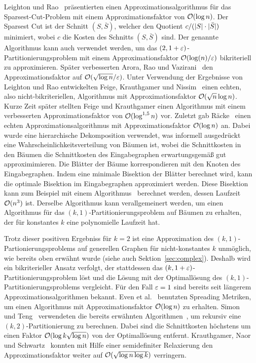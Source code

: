 Leighton und Rao~\cite{LR99} präsentierten einen Approximationsalgorithmus für das Sparsest-Cut-Problem mit einem Approximationsfaktor von $\mathcal{O}(\log n)$.
Der Sparsest Cut ist der Schnitt $(S, \bar{S})$, welcher den Quotient $c/(\lvert S\rvert \cdot  \lvert\bar{S}\rvert)$ minimiert, wobei $c$ die Kosten des Schnitts $(S, \bar{S})$ sind.
Der genannte Algorithmus kann auch verwendet werden, um das $(2, 1 + \varepsilon)$\hyp Partitionierungsproblem mit einem Approximationsfaktor $\mathcal{O}(\log(n)/\varepsilon)$ bikriteriell zu approximieren.
Später verbesserten Arora, Rao und Vazirani~\cite{ARV09} den Approximationsfaktor auf $\mathcal{O}(\sqrt{\log n}/\varepsilon)$.
Unter Verwendung der Ergebnisse von Leighton und Rao entwickelten Feige, Krauthgamer und Nissim~\cite{FKN00} einen echten, also nicht-bikriteriellen, Algorithmus mit Approximationsfaktor $\mathcal{O}(\sqrt{n} \log n)$.
Kurze Zeit später stellten Feige und Krauthgamer einen Algorithmus mit einem verbesserten Approximationsfaktor von $\mathcal{O}(\log^{1,5} n)$ vor.
Zuletzt gab Räcke~\cite{rc08} einen echten Approximationsalgorithmus mit Approximationsfaktor $\mathcal{O}(\log n)$ an.
Dabei wurde eine hierarchische Dekomposition verwendet, was informell ausgedrückt eine Wahrscheinlichkeitsverteilung von Bäumen ist, wobei die Schnittkosten in den Bäumen die Schnittkosten des Eingabegraphen erwartungsgemäß gut approximimieren.
Die Blätter der Bäume korrespondieren mit den Knoten des Eingabegraphen.
Indem eine minimale Bisektion der Blätter berechnet wird, kann die optimale Bisektion im Eingabegraphen approximiert werden.
Diese Bisektion kann zum Beispiel mit einem Algorithmus~\cite{mcg78, ws11} berechnet werden, dessen Laufzeit $\mathcal{O}(n^3)$ ist.
Derselbe Algorithmus kann verallgemeinert werden, um einen Algorithmus für das $(k, 1)$\hyp Partitionierungsproblem auf Bäumen zu erhalten, der für konstantes $k$ eine polynomielle Laufzeit hat.

Trotz dieser positiven Ergebniss für $k=2$ ist eine Approximation des $(k, 1)$\hyp Partionierungsproblems auf generellen Graphen für nicht-konstantes $k$ unmöglich, wie bereits oben erwähnt wurde (siehe auch Sektion~\ref{sec:complex}).
Deshalb wird ein bikriterieller Ansatz verfolgt, der stattdessen das $(k,1+\varepsilon)$\hyp Partitionierungsproblem löst und die Lösung mit der Optimallösung des $(k, 1)$\hyp Partitionierungsproblems vergleicht.
Für den Fall $\varepsilon = 1$ sind bereits seit längerem Approximationsalgorithmen bekannt.
Even et al.~\cite{ENR+97} benutzten Spreading Metriken, um einen Algorithmus mit Approximationsfaktor $\mathcal{O}(\log n)$ zu erhalten.
Simon und Teng~\cite{ST97} verwendeten die bereits erwähnten Algorithmen~\cite{LR99, ARV09}, um rekursiv eine $(k, 2)$\hyp Partitionierung zu berechnen.
Dabei sind die Schnittkosten höchstens um einen Faktor $\mathcal{O}(\log k \sqrt{\log n})$ von der Optimallösung entfernt.
Krauthgamer, Naor und Schwartz~\cite{KNS09} konnten mit Hilfe einer semidefiniter Relaxierung den Approximationsfaktor weiter auf $\mathcal{O}(\sqrt{\log n \log k})$ verringern.

